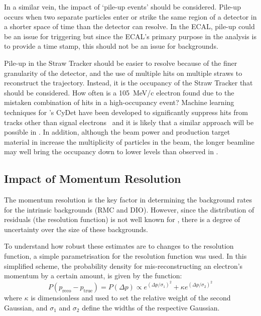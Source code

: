 In a similar vein, the impact of `pile-up events' should be considered.
Pile-up occurs when two separate particles enter or strike the same region of a detector in a shorter space of time than the detector can resolve.
In the ECAL, pile-up could be an issue for triggering but since the ECAL's primary purpose in the analysis is to provide a time stamp, this should not be an issue for backgrounds.

Pile-up in the Straw Tracker should be easier to resolve because of the finer granularity of the detector, and the use of multiple hits on multiple straws to reconstruct the trajectory.
Instead, it is the occupancy of the Straw Tracker that should be considered.  
How often is a 105~MeV/c electron found due to the mistaken combination of hits in a high-occupancy event?
Machine learning techniques for \phaseI's \ac{CyDet} have been developed to significantly suppress hits from tracks other than signal electrons~\cite{TDR2016} and it is likely that a similar approach will be possible in \phaseII.
In addition, although the beam power and production target material in \phaseII increase the multiplicity of particles in the beam, the longer beamline may well bring the occupancy down to lower levels than observed in \phaseI.


\subsection{Impact of Momentum Resolution}
\FigBgVsResolution
The momentum resolution is the key factor in determining the background rates for the intrinsic backgrounds (\acf{RMC} and \acf{DIO}).
However, since the distribution of residuals (the resolution function) is not well known for \phaseII, there is a degree of uncertainty over the size of these backgrounds.

To understand how robust these estimates are to changes to the resolution function, a simple parametrisation for the resolution function was used.
In this simplified scheme, the probability density for mis-reconstructing an electron's momentum by a certain amount, is given by the function:
\begin{equation}
	P(p_\textrm{reco}-p_\textrm{true}) = P(\Delta{}p) \propto e^{(\Delta{}p/\sigma_1)^2}+\kappa e^{(\Delta{}p/\sigma_2)^2}
\end{equation}
where $\kappa$ is dimensionless and used to set the relative weight of the second Gaussian, and $\sigma_1$ and $\sigma_2$ define the widths of the respective Gaussian.

